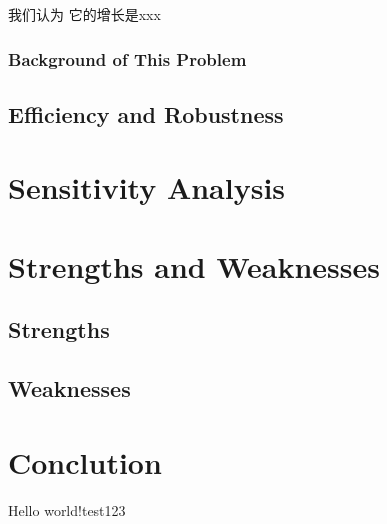 \documentclass[a4paper]{article}
\begin{document}
我们认为 它的增长是xxx
\subsubsection{Background of This Problem}
\subsection{Efficiency and Robustness}
\section{Sensitivity Analysis}
\section{Strengths and Weaknesses}
\subsection{Strengths}
\subsection{Weaknesses}
\section{Conclution}
Hello world!test123
\end{document}
